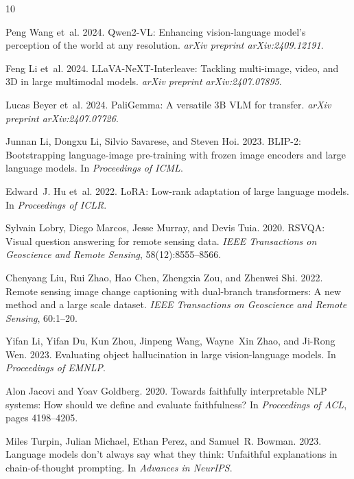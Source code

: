 \documentclass[11pt]{article}
\begin{document}
\begin{thebibliography}{10}

Peng Wang et~al. 2024.
\newblock Qwen2-VL: Enhancing vision-language model's perception of the world at any resolution.
\newblock \emph{arXiv preprint arXiv:2409.12191}.

Feng Li et~al. 2024.
\newblock LLaVA-NeXT-Interleave: Tackling multi-image, video, and 3D in large multimodal models.
\newblock \emph{arXiv preprint arXiv:2407.07895}.

Lucas Beyer et~al. 2024.
\newblock PaliGemma: A versatile 3B VLM for transfer.
\newblock \emph{arXiv preprint arXiv:2407.07726}.

Junnan Li, Dongxu Li, Silvio Savarese, and Steven Hoi. 2023.
\newblock BLIP-2: Bootstrapping language-image pre-training with frozen image encoders and large language models.
\newblock In \emph{Proceedings of ICML}.

Edward~J. Hu et~al. 2022.
\newblock LoRA: Low-rank adaptation of large language models.
\newblock In \emph{Proceedings of ICLR}.

Sylvain Lobry, Diego Marcos, Jesse Murray, and Devis Tuia. 2020.
\newblock RSVQA: Visual question answering for remote sensing data.
\newblock \emph{IEEE Transactions on Geoscience and Remote Sensing}, 58(12):8555--8566.

Chenyang Liu, Rui Zhao, Hao Chen, Zhengxia Zou, and Zhenwei Shi. 2022.
\newblock Remote sensing image change captioning with dual-branch transformers: A new method and a large scale dataset.
\newblock \emph{IEEE Transactions on Geoscience and Remote Sensing}, 60:1--20.

Yifan Li, Yifan Du, Kun Zhou, Jinpeng Wang, Wayne~Xin Zhao, and Ji-Rong Wen. 2023.
\newblock Evaluating object hallucination in large vision-language models.
\newblock In \emph{Proceedings of EMNLP}.

Alon Jacovi and Yoav Goldberg. 2020.
\newblock Towards faithfully interpretable NLP systems: How should we define and evaluate faithfulness?
\newblock In \emph{Proceedings of ACL}, pages 4198--4205.

Miles Turpin, Julian Michael, Ethan Perez, and Samuel~R. Bowman. 2023.
\newblock Language models don't always say what they think: Unfaithful explanations in chain-of-thought prompting.
\newblock In \emph{Advances in NeurIPS}.

\end{thebibliography}
\end{document}
